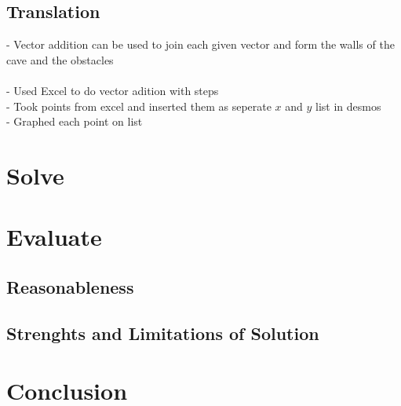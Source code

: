 \documentclass[11pt, letterpaper]{article}
\begin{document}
\subsection{Translation}
\par 
- Vector addition can be used to join each given vector and form the walls of the cave and the obstacles
\\
\\
- Used Excel to do vector adition with steps
\\ 
- Took points from excel and inserted them as seperate $x$ and $y$ list in desmos
\\
- Graphed each point on list

\par 


\section{Solve}

\par 


\section{Evaluate}



\subsection{Reasonableness}


\subsection{Strenghts and Limitations of Solution}


\section{Conclusion}


 
\end{document}

